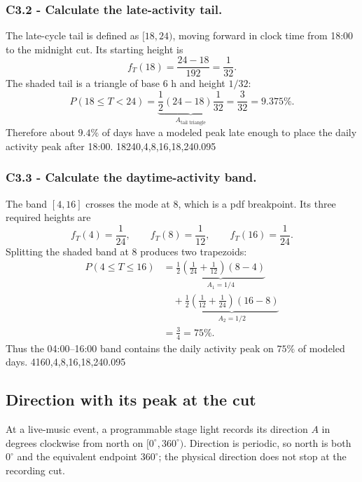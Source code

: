 	\subsubsection*{C3.2 - Calculate the late-activity tail.}
	\label{subsec:c3-triangular-activity-b}
	The late-cycle tail is defined as $[18,24)$, moving forward in clock time from
	18:00 to the midnight cut.  Its starting height is
	\[
	f_T(18)=\frac{24-18}{192}=\frac1{32}.
	\]
	The shaded tail is a triangle of base $6$ h and height $1/32$:
	\[
	P(18\le T<24)
	=\underbrace{\frac12(24-18)\frac1{32}}_{A_{\text{tail triangle}}}
	=\frac3{32}=9.375\%.
	\]
	Therefore about $9.4\%$ of days have a modeled peak late enough to place the daily activity peak after 18:00.
	\begingroup
	{18}{24}{0,4,8,16,18,24}{0.095}
	\endgroup
	
	\subsubsection*{C3.3 - Calculate the daytime-activity band.}
	\label{subsec:c3-triangular-activity-c}
	The band $[4,16]$ crosses the mode at $8$, which is a pdf breakpoint.  Its
	three required heights are
	\[
	f_T(4)=\frac1{24},\qquad f_T(8)=\frac1{12},
	\qquad f_T(16)=\frac1{24}.
	\]
	Splitting the shaded band at $8$ produces two trapezoids:
	\[
	\begin{aligned}
		P(4\le T\le16)
		&=\underbrace{\frac12\left(\frac1{24}+\frac1{12}\right)(8-4)}
		_{A_1=1/4}\\
		&\quad+\underbrace{\frac12\left(\frac1{12}+\frac1{24}\right)(16-8)}
		_{A_2=1/2}\\
		&=\frac34=75\%.
	\end{aligned}
	\]
	Thus the 04:00--16:00 band contains the daily activity peak on $75\%$
	of modeled days.
	\begingroup
	{4}{16}{0,4,8,16,18,24}{0.095}
	\endgroup
	
	\subsection{Direction with its peak at the cut}\label{sec:c3-triangular-north}
	At a live-music event, a programmable stage light records its direction $A$ in
	degrees clockwise from north on $[0^\circ,360^\circ)$.  Direction is periodic,
	so north is both $0^\circ$ and the equivalent endpoint $360^\circ$; the physical
	direction does not stop at the recording cut.
	
